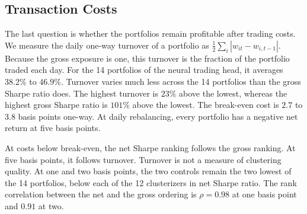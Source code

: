 \subsection{Transaction Costs}
\label{sec:costs}
The last question is whether the portfolios remain profitable after trading costs.
We measure the daily one-way turnover of a portfolio as $\tfrac{1}{2}\sum_i |w_{it} - w_{i,t-1}|$. Because the gross exposure is one, this turnover is the fraction of the portfolio traded each day. For the 14 portfolios of the neural trading head, it averages $38.2\%$ to $46.9\%$. Turnover varies much less across the 14 portfolios than the gross Sharpe ratio does. The highest turnover is $23\%$ above the lowest, whereas the highest gross Sharpe ratio is $101\%$ above the lowest. The break-even cost is $2.7$ to $3.8$ basis points one-way. At daily rebalancing, every portfolio has a negative net return at five basis points.

At costs below break-even, the net Sharpe ranking follows the gross ranking. At five basis points, it follows turnover. Turnover is not a measure of clustering quality. At one and two basis points, the two controls
remain the two lowest of the 14 portfolios, below each of the 12 clusterizers
in net Sharpe ratio. The rank correlation between the net and the gross ordering is $\rho = 0.98$ at one basis point and $0.91$ at two.

